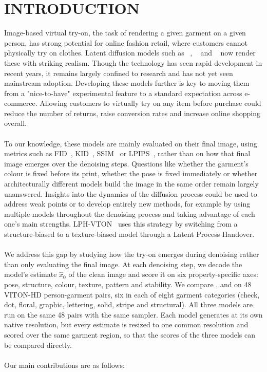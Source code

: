 \section{\uppercase{Introduction}}
\label{sec:introduction}

Image-based virtual try-on, the task of rendering a given garment on a given person, has strong potential for online fashion retail, where customers cannot physically try on clothes. Latent diffusion models such as \catvton~\cite{chong2025catvton}, \ootd~\cite{xu2025ootdiffusion} and \idm~\cite{choi2024idmvton} now render these with striking realism. Though the technology has seen rapid development in recent years, it remains largely confined to research and has not yet seen mainstream adoption. Developing these models further is key to moving them from a "nice-to-have" experimental feature to a standard expectation across e-commerce. Allowing customers to virtually try on any item before purchase could reduce the number of returns, raise conversion rates and increase online shopping overall.  
\\ \\
To our knowledge, these models are mainly evaluated on their final image, using metrics such as FID~\cite{heusel2017fid}, KID~\cite{binkowski2018kid}, SSIM~\cite{wang2004ssim} or LPIPS~\cite{zhang2018lpips}, rather than on how that final image emerges over the denoising steps. Questions like whether the garment's colour is fixed before its print, whether the pose is fixed immediately or whether architecturally different models build the image in the same order remain largely unanswered. Insights into the dynamics of the diffusion process could be used to address weak points or to develop entirely new methods, for example by using multiple models throughout the denoising process and taking advantage of each one's main strengths. LPH-VTON~\cite{liu2026lphvton} uses this strategy by switching from a structure-biased to a texture-biased model through a Latent Process Handover.
\\ \\
We address this gap by studying how the try-on emerges during denoising rather than only evaluating the final image. At each denoising step, we decode the model's estimate $\hat{x}_0$ of the clean image and score it on six property-specific axes: pose, structure, colour, texture, pattern and stability. We compare \catvton, \ootd and \idm on 48 VITON-HD person-garment pairs, six in each of eight garment categories (check, dot, floral, graphic, lettering, solid, stripe and structural). All three models are run on the same 48 pairs with the same sampler. Each model generates at its own native resolution, but every estimate is resized to one common resolution and scored over the same garment region, so that the scores of the three models can be compared directly.
\\ \\
Our main contributions are as follows: 

